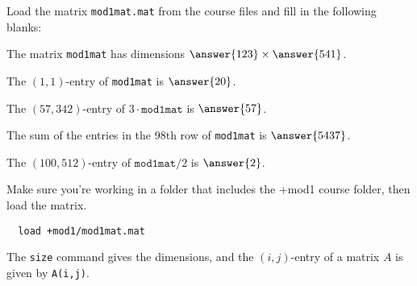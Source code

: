 \documentclass{ximera}
\author{Zack Reed}
\begin{document}
  
\begin{problem}

  Load the matrix \texttt{mod1mat.mat} from the course files and fill in the following blanks:
  
  \item The matrix \texttt{mod1mat} has dimensions $\answer{123}\times \answer{541}$.
  \item The $(1,1)$-entry of \texttt{mod1mat} is $\answer{20}$.
  \item The $(57,342)$-entry of $3\cdot\texttt{mod1mat}$ is $\answer{57}$.
  \item The sum of the entries in the 98th row of \texttt{mod1mat} is $\answer{5437}$.
  \item The $(100,512)$-entry of $\texttt{mod1mat}/2$ is $\answer{2}$.
  
  \begin{hint}
  
    Make sure you're working in a folder that includes the +mod1 course folder, then load the matrix.
\begin{verbatim}
  load +mod1/mod1mat.mat
\end{verbatim}

The \texttt{size} command gives the dimensions, and the $(i,j)$-entry of a matrix $A$ is given by \texttt{A(i,j)}.

\end{hint}

\end{problem}
\end{document}

